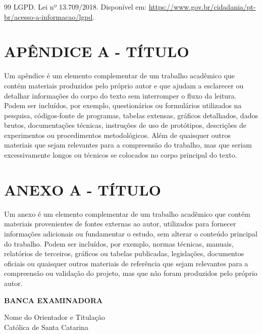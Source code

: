 \documentclass[a4paper,12pt]{article}
\begin{document}
\newpage
{}

\begin{thebibliography}{99}
 LGPD. Lei nº 13.709/2018. Disponível em: \url{https://www.gov.br/cidadania/pt-br/acesso-a-informacao/lgpd}.
\end{thebibliography}

\newpage

\section{APÊNDICE A - TÍTULO}
Um apêndice é um elemento complementar de um trabalho acadêmico
que contém materiais produzidos pelo próprio autor e que ajudam a esclarecer
ou detalhar informações do corpo do texto sem interromper o fluxo da leitura.
Podem ser incluídos, por exemplo, questionários ou formulários utilizados
na pesquisa, códigos-fonte de programas, tabelas extensas, gráficos detalhados,
dados brutos, documentações técnicas, instruções de uso de protótipos,
descrições de experimentos ou procedimentos metodológicos.
Além de quaisquer outros materiais que sejam relevantes para a
compreensão do trabalho, mas que seriam excessivamente longos ou técnicos
se colocados no corpo principal do texto.

\section{ANEXO A - TÍTULO}
Um anexo é um elemento complementar de um trabalho acadêmico que
contém materiais provenientes de fontes externas ao autor, utilizados para
fornecer informações adicionais ou fundamentar o estudo, sem alterar o
conteúdo principal do trabalho.
Podem ser incluídos, por exemplo, normas técnicas, manuais, relatórios
de terceiros, gráficos ou tabelas publicadas, legislações, documentos oficiais ou
quaisquer outros materiais de referência que sejam relevantes para a
compreensão ou validação do projeto, mas que não foram produzidos pelo
próprio autor.

\newpage

\begin{center}
\Large\bfseries BANCA EXAMINADORA
\end{center}

\vspace{2.8cm}

\begin{center}
\normalsize
Nome do Orientador e Titulação\\
Católica de Santa Catarina
\end{center}
\end{document}
